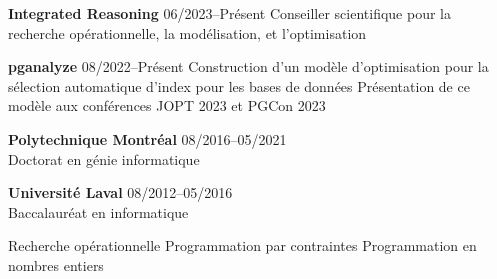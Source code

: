 \documentclass{memoir}
\begin{document}
\par
\vspace{1.5\baselineskip}
\begin{list}{}{
    \setlength\leftmargin{1.2in}
    \setlength\rightmargin{0in}
    \setlength{}
    \setlength{}
    \setlength\listparindent{0in}
    \setlength\itemindent{0in}
    \setlength\parskip{0in}
    \setlength\topsep{0in}
    \setlength\parsep{0in}
    \setlength\itemsep{0.90\baselineskip}
    \setlength\partopsep{0in}}

  


  \Item \textbf{Integrated Reasoning} \hfill 06/2023--Présent
  \BulletItem Conseiller scientifique pour la recherche opérationnelle, la modélisation, et l'optimisation
  
  \Item \textbf{pganalyze} \hfill 08/2022--Présent
  \BulletItem Construction d'un modèle d'optimisation pour la sélection automatique d'index pour les bases de données
  \BulletItem Présentation de ce modèle aux conférences JOPT 2023 et PGCon 2023
  



  

  \Item \textbf{Polytechnique Montréal} \hfill 08/2016--05/2021 \\
  Doctorat en génie informatique

  \Item \textbf{Université Laval} \hfill 08/2012--05/2016 \\
  Baccalauréat en informatique

  

  
  \BulletItem Recherche opérationnelle
  \BulletItem Programmation par contraintes
  \BulletItem Programmation en nombres entiers

  

\end{list}
\end{document}
